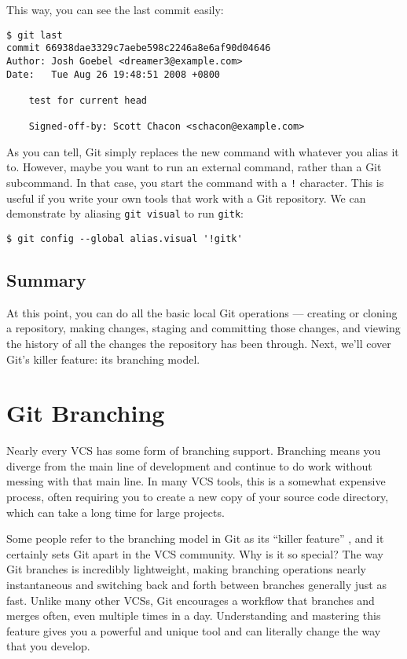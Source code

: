 \documentclass[a4paper]{book}
\newcommand{\chap}[1]{\newpage\thispagestyle{empty}\chapter{#1}\label{chap:\thechapter}}
\begin{document}
This way, you can see the last commit easily:

\begin{shaded}\begin{verbatim}
$ git last
commit 66938dae3329c7aebe598c2246a8e6af90d04646
Author: Josh Goebel <dreamer3@example.com>
Date:   Tue Aug 26 19:48:51 2008 +0800

    test for current head

    Signed-off-by: Scott Chacon <schacon@example.com>
\end{verbatim}\end{shaded}

As you can tell, Git simply replaces the new command with whatever you alias it to. However, maybe you want to run an external command, rather than a Git subcommand. In that case, you start the command with a \texttt{!} character. This is useful if you write your own tools that work with a Git repository. We can demonstrate by aliasing \texttt{git visual} to run \texttt{gitk}:

\begin{shaded}\begin{verbatim}
$ git config --global alias.visual '!gitk'
\end{verbatim}\end{shaded}

\section{Summary}\label{summary-1}

At this point, you can do all the basic local Git operations --- creating or cloning a repository, making changes, staging and committing those changes, and viewing the history of all the changes the repository has been through. Next, we'll cover Git's killer feature: its branching model.

\chap{Git Branching}\label{git-branching}

Nearly every VCS has some form of branching support. Branching means you diverge from the main line of development and continue to do work without messing with that main line. In many VCS tools, this is a somewhat expensive process, often requiring you to create a new copy of your source code directory, which can take a long time for large projects.

Some people refer to the branching model in Git as its “killer feature” , and it certainly sets Git apart in the VCS community. Why is it so special? The way Git branches is incredibly lightweight, making branching operations nearly instantaneous and switching back and forth between branches generally just as fast. Unlike many other VCSs, Git encourages a workflow that branches and merges often, even multiple times in a day. Understanding and mastering this feature gives you a powerful and unique tool and can literally change the way that you develop.
\end{document}
